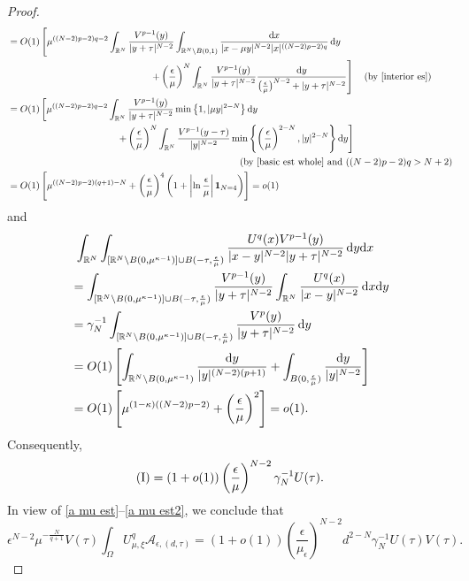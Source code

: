 \documentclass[reqno]{amsart}
\theoremstyle{remark}
\newcommand{\ep}{\epsilon}
\newcommand{\ga}{\gamma}
\newcommand{\R}{\mathbb{R}}
\newcommand{\mone}{\mathbf{1}}
\newcommand{\mca}{\mathcal{A}}
\newcommand{\dx}{\textup{d}x}
\newcommand{\dy}{\textup{d}y}
\newcommand{\mx}{{\mu,\xi}}
\renewcommand{\(}{\left(}
\renewcommand{\)}{\right)}
\numberwithin{equation}{section}
\begin{document}
\begin{proof}
\begin{align*}
&= O(1) \left[\mu^{((N-2)p-2)q-2}\int_{\R^N} \frac{V^{p-1}(y)}{|y+\tau|^{N-2}} \int_{\R^N\setminus B(0,1)} \frac{\dx}{|x-\mu y|^{N-2}|x|^{((N-2)p-2)q}}\, \dy \right. \\
&\hspace{150pt} \left. + \(\frac{\ep}{\mu}\)^N \int_{\R^N} \frac{V^{p-1}(y)}{|y+\tau|^{N-2}} \frac{\dy}{\big(\frac{\ep}{\mu}\big)^{N-2}+|y+\tau|^{N-2}}\right] \quad \textup{(by \eqref{interior es})}\\
&= O(1) \left[\mu^{((N-2)p-2)q-2}\int_{\R^N} \frac{V^{p-1}(y)}{|y+\tau|^{N-2}}\min\left\{1, |\mu y|^{2-N}\right\} \dy \right. \\
&\hspace{115pt} \left. + \(\frac{\ep}{\mu}\)^N \int_{\R^N} \frac{V^{p-1}(y-\tau)}{|y|^{N-2}} \min\left\{\(\frac{\ep}{\mu}\)^{2-N}, |y|^{2-N}\right\} \dy\right] \\
& \hspace{245pt} (\textup{by } \eqref{basic est whole} \textup{ and } ((N-2)p-2)q > N+2)\\
&= O(1) \left[\mu^{((N-2)p-2)(q+1)-N} + \(\frac{\ep}{\mu}\)^4 \(1+\left|\ln \frac{\ep}{\mu}\right|\mone_{N=4}\)\right] = o(1)
\end{align*}
and
\begin{align*}
&\ \int_{\R^N} \int_{[\R^N\setminus B(0,\mu^{\kappa-1})]\cup B(-\tau,\frac{\ep}{\mu})} \frac{U^q(x) V^{p-1}(y)}{|x-y|^{N-2} |y+\tau|^{N-2}}\, \dy\dx \\
&= \int_{[\R^N\setminus B(0,\mu^{\kappa-1})]\cup B(-\tau,\frac{\ep}{\mu})} \frac{V^{p-1}(y)}{|y+\tau|^{N-2}}\int_{\R^N} \frac{U^q(x)}{|x-y|^{N-2}}\, \dx\dy \\
&= \ga_N^{-1} \int_{[\R^N\setminus B(0,\mu^{\kappa-1})]\cup B(-\tau,\frac{\ep}{\mu})} \frac{V^p(y)}{|y+\tau|^{N-2}}\, \dy \\
&= O(1) \left[\int_{\R^N\setminus B(0,\mu^{\kappa-1})} \frac{\dy}{|y|^{(N-2)(p+1)}} + \int_{B(0,\frac{\ep}{\mu})}\frac{\dy}{|y|^{N-2}}\right] \\
&= O(1) \left[\mu^{(1-\kappa)((N-2)p-2)}+\(\frac{\ep}{\mu}\)^2\right]=o(1).
\end{align*}
Consequently,
\begin{equation}\label{a mu est2}
\textup{(I)} = (1+o(1))\(\frac{\ep}{\mu}\)^{N-2}\ga_N^{-1} U(\tau).
\end{equation}
In view of \eqref{a mu est}--\eqref{a mu est2}, we conclude that
\begin{equation}\label{second term est4}
\ep^{N-2}\mu^{-\frac{N}{q+1}}V(\tau) \int_\Omega U_\mx^q \mca_{\ep,(d,\tau)} = (1+o(1))\(\frac{\ep}{\mu_\ep}\)^{N-2}d^{2-N}\ga_N^{-1} U(\tau)V(\tau).

\end{equation}
\end{proof}
\end{document}
